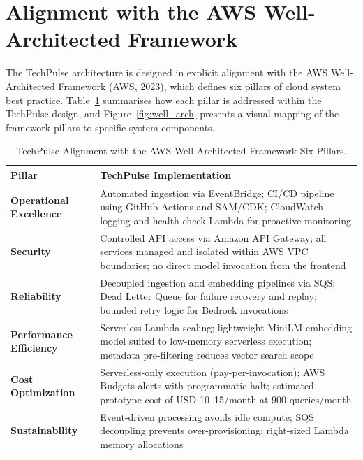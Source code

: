 \documentclass[12pt,a4paper]{report}
\begin{document}
\section{Alignment with the AWS Well-Architected Framework}
\label{sec:well_architected}

The TechPulse architecture is designed in explicit alignment with the AWS Well-Architected Framework (AWS, 2023), which defines six pillars of cloud system best practice. Table~\ref{tab:well_arch} summarises how each pillar is addressed within the TechPulse design, and Figure~\ref{fig:well_arch} presents a visual mapping of the framework pillars to specific system components.

\begin{table}[H]
\caption{TechPulse Alignment with the AWS Well-Architected Framework Six Pillars.}
\label{tab:well_arch}
\centering
\begin{tabular}{p{3.2cm}p{9.3cm}}
\toprule
\textbf{Pillar} & \textbf{TechPulse Implementation} \\
\midrule
\textbf{Operational Excellence} & Automated ingestion via EventBridge; CI/CD pipeline using GitHub Actions and SAM/CDK; CloudWatch logging and health-check Lambda for proactive monitoring \\[4pt]
\textbf{Security} & Controlled API access via Amazon API Gateway; all services managed and isolated within AWS VPC boundaries; no direct model invocation from the frontend \\[4pt]
\textbf{Reliability} & Decoupled ingestion and embedding pipelines via SQS; Dead Letter Queue for failure recovery and replay; bounded retry logic for Bedrock invocations \\[4pt]
\textbf{Performance Efficiency} & Serverless Lambda scaling; lightweight MiniLM embedding model suited to low-memory serverless execution; metadata pre-filtering reduces vector search scope \\[4pt]
\textbf{Cost Optimization} & Serverless-only execution (pay-per-invocation); AWS Budgets alerts with programmatic halt; estimated prototype cost of USD 10--15/month at 900 queries/month \\[4pt]
\textbf{Sustainability} & Event-driven processing avoids idle compute; SQS decoupling prevents over-provisioning; right-sized Lambda memory allocations \\
\bottomrule
\end{tabular}
\end{table}
\end{document}
